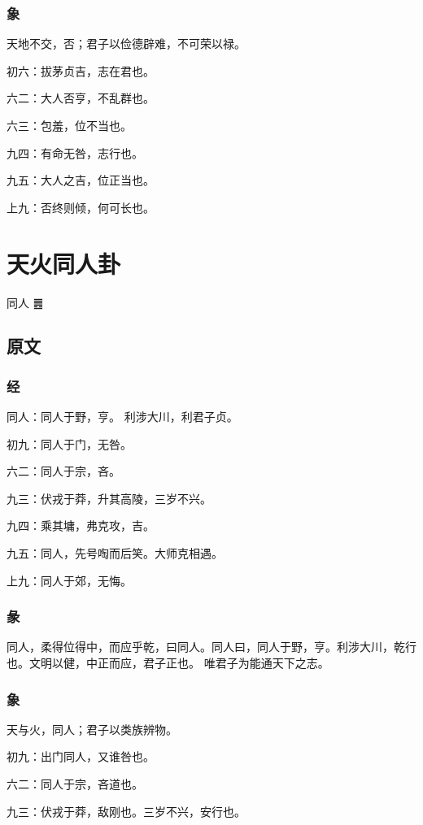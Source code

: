 \documentclass[12pt,oneside]{book}
\begin{document}
\subsection{象}
天地不交，否；君子以俭德辟难，不可荣以禄。

初六：拔茅贞吉，志在君也。

六二：大人否亨，不乱群也。

六三：包羞，位不当也。

九四：有命无咎，志行也。

九五：大人之吉，位正当也。

上九：否终则倾，何可长也。


\chapter{天火同人卦}
同人 {\Large ䷌}

\section{原文}

\subsection{经}
同人：同人于野，亨。 利涉大川，利君子贞。

初九：同人于门，无咎。

六二：同人于宗，吝。

九三：伏戎于莽，升其高陵，三岁不兴。

九四：乘其墉，弗克攻，吉。

九五：同人，先号啕而后笑。大师克相遇。

上九：同人于郊，无悔。

\subsection{彖}
同人，柔得位得中，而应乎乾，曰同人。同人曰，同人于野，亨。利涉大川，乾行也。文明以健，中正而应，君子正也。 唯君子为能通天下之志。

\subsection{象}
天与火，同人；君子以类族辨物。

初九：出门同人，又谁咎也。

六二：同人于宗，吝道也。

九三：伏戎于莽，敌刚也。三岁不兴，安行也。
\end{document}

